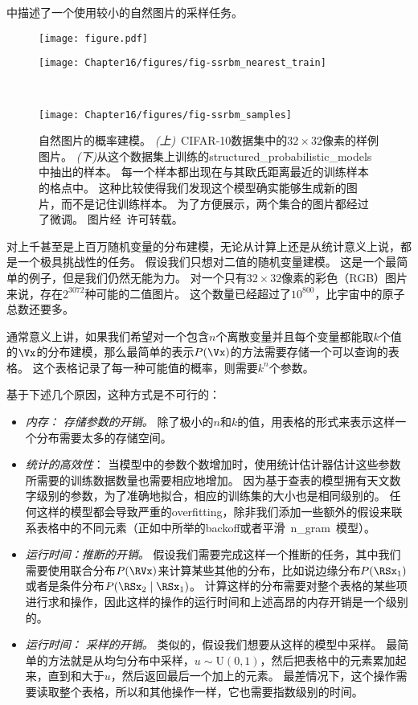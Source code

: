 中描述了一个使用较小的自然图片的采样任务。

\begin{figure}[!htb]
\ifOpenSource
\centerline{\texttt{[image: figure.pdf]}}
\else
	\centerline{\texttt{[image: Chapter16/figures/fig-ssrbm\_nearest\_train]}}\ \\
     \centerline{\texttt{[image: Chapter16/figures/fig-ssrbm\_samples]}}
\fi
	\caption{自然图片的概率建模。
\emph{(上)}~CIFAR-10数据集\citep{KrizhevskyHinton2009}中的$32\times 32$像素的样例图片。
\emph{(下)}从这个数据集上训练的\gls{structured_probabilistic_models}中抽出的样本。
每一个样本都出现在与其欧氏距离最近的训练样本的格点中。
这种比较使得我们发现这个模型确实能够生成新的图片，而不是记住训练样本。
为了方便展示，两个集合的图片都经过了微调。
图片经~\citet{Courville+al-2011-small}许可转载。}
	\label{fig:chap16_fig-ssrbm}
\end{figure}

对上千甚至是上百万随机变量的分布建模，无论从计算上还是从统计意义上说，都是一个极具挑战性的任务。
假设我们只想对二值的随机变量建模。
这是一个最简单的例子，但是我们仍然无能为力。
对一个只有$32\times 32$像素的彩色（RGB）图片来说，存在$2^{3072}$种可能的二值图片。
这个数量已经超过了$10^{800}$，比宇宙中的原子总数还要多。

通常意义上讲，如果我们希望对一个包含$n$个离散变量并且每个变量都能取$k$个值的$\Vx$的分布建模，那么最简单的表示$P(\Vx)$的方法需要存储一个可以查询的表格。
这个表格记录了每一种可能值的概率，则需要$k^n$个参数。

基于下述几个原因，这种方式是不可行的：
\begin{itemize}
\item \emph{内存： 存储参数的开销。}
除了极小的$n$和$k$的值，用表格的形式来表示这样一个分布需要太多的存储空间。
	
\item  \emph{统计的高效性}： 
当模型中的参数个数增加时，使用统计估计器估计这些参数所需要的训练数据数量也需要相应地增加。
因为基于查表的模型拥有天文数字级别的参数，为了准确地拟合，相应的训练集的大小也是相同级别的。
任何这样的模型都会导致严重的\gls{overfitting}，除非我们添加一些额外的假设来联系表格中的不同元素（正如中所举的\gls{backoff}或者平滑~\gls{n_gram}~模型）。
	
\item \emph{运行时间：推断的开销。}
假设我们需要完成这样一个推断的任务，其中我们需要使用联合分布$P(\RVx)$来计算某些其他的分布，比如说边缘分布$P(\RSx_1)$或者是条件分布$P(\RSx_2\mid \RSx_1)$。
计算这样的分布需要对整个表格的某些项进行求和操作，因此这样的操作的运行时间和上述高昂的内存开销是一个级别的。
	
	
\item \emph{运行时间： 采样的开销。}
类似的，假设我们想要从这样的模型中采样。
最简单的方法就是从均匀分布中采样，$u\sim \text{U}(0,1)$，然后把表格中的元素累加起来，直到和大于$u$，然后返回最后一个加上的元素。
最差情况下，这个操作需要读取整个表格，所以和其他操作一样，它也需要指数级别的时间。
\end{itemize}



